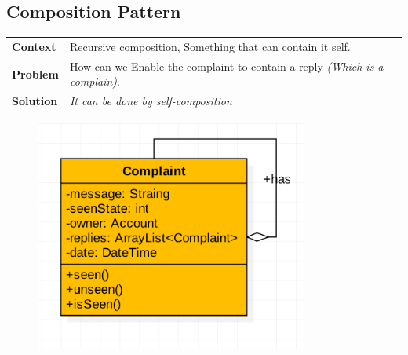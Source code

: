 \documentclass{article}
\begin{document}
\subsection{Composition Pattern}
    \begin{tabular}{ l | l }
    \toprule
      \rowcolor{LightCyan}
      \textbf{Context}            & Recursive composition, Something that can contain it self.\\
      \textbf{Problem}            & How can we Enable the complaint to contain a reply \textit{(Which is a complain)}.\\
      \rowcolor{LightCyan}
      \textbf{Solution}           & \textit{It can be done by self-composition}\\
    \toprule
    \end{tabular}
\begin{figure}[ht!]
\centering
\includegraphics[width=90mm]{Composition Design Pattern.png}
\end{figure}





\newpage
\end{document}
